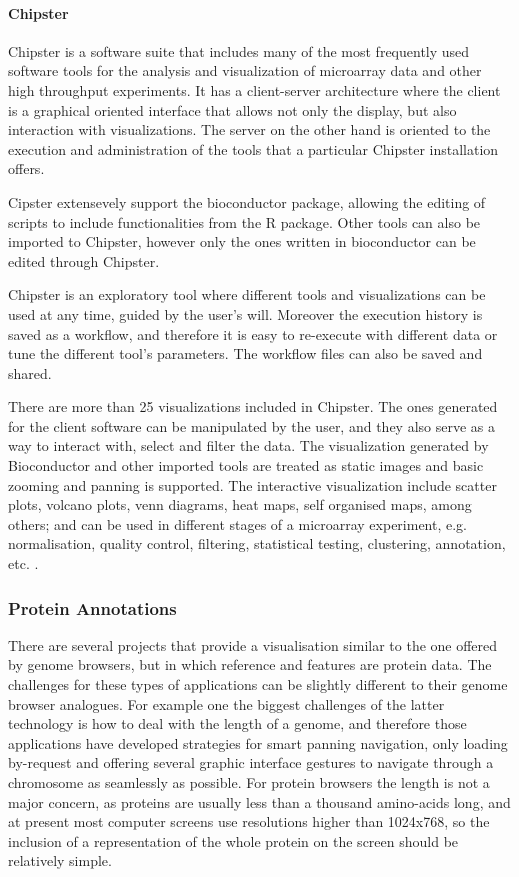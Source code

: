 \paragraph{Chipster}
Chipster is a software suite that includes many of the most frequently used software tools for the analysis and visualization of microarray data and other high throughput experiments. It has a client-server architecture where the client is a graphical oriented interface that allows not only the display, but also interaction with visualizations. The server on the other hand is oriented to the execution and administration of the tools that a particular Chipster installation offers.

Cipster extensevely support the bioconductor package, allowing the editing of scripts to include functionalities from the R package. Other tools can also be imported to Chipster, however only the ones written in bioconductor can be edited through Chipster.

Chipster is an exploratory tool where different tools and visualizations can be used at any time, guided by the user's will. Moreover the execution history is saved as a workflow, and therefore it is easy to re-execute with different data or tune the different tool's parameters. The workflow files can also be saved and shared.

There are more than 25 visualizations included in Chipster. The ones generated for the client software can be manipulated by the user, and they also serve as a way to interact with, select and filter the data. The visualization generated by Bioconductor and other imported tools are treated as static images and basic zooming and panning is supported. The interactive visualization include scatter plots, volcano plots, venn diagrams, heat maps, self organised maps, among others; and can be used in different stages of a microarray experiment, e.g. normalisation, quality control, filtering, statistical testing, clustering, annotation, etc. \cite{KAL2011}. 


\subsubsection{Protein Annotations}
There are several projects that provide a visualisation similar to the one offered by genome browsers, but in which reference and features are protein data. The challenges for these types of applications can be slightly different to their genome browser analogues. For example one the biggest challenges of the latter technology is how to deal with the length of a genome, and therefore those applications have developed strategies for smart panning navigation, only loading by-request and offering several graphic interface gestures to navigate through a chromosome as seamlessly as possible. For protein browsers the length is not a major concern, as proteins are usually less than a thousand amino-acids long, and at present most computer screens use resolutions higher than 1024x768, so the inclusion of a representation of the whole protein on the screen should be relatively simple.

